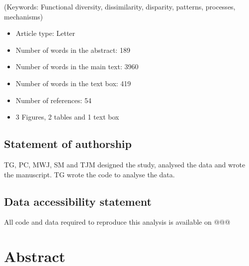 \documentclass[12pt,letterpaper]{article}
\begin{document}
\noindent (Keywords: Functional diversity, dissimilarity, disparity, patterns, processes, mechanisms)\\

\begin{itemize}
   \item Article type: Letter
   \item Number of words in the abstract: 189
   \item Number of words in the main text: 3960
   \item Number of words in the text box: 419
   \item Number of references: 54
   \item 3 Figures, 2 tables and 1 text box
\end{itemize}

\subsection{Statement of authorship}

TG, PC, MWJ, SM and TJM designed the study, analysed the data and wrote the manuscript. TG wrote the code to analyse the data.

\subsection{Data accessibility statement}

All code and data required to reproduce this analysis is available on @@@

%
%

\newpage
\modulolinenumbers[1]
\linenumbers

\section{Abstract}
\end{document}
